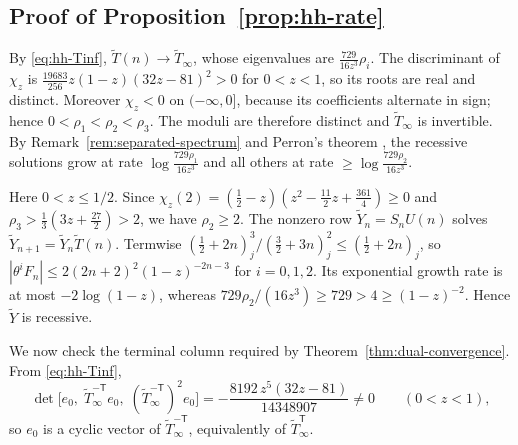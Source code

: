 \documentclass[oneside,english,11pt]{amsart}
\begin{document}
\subsection{Proof of Proposition~\ref{prop:hh-rate}}\label{app:hh-rate}
By \eqref{eq:hh-Tinf}, $\tilde T(n)\to\tilde T_\infty$, whose eigenvalues are $\frac{729}{16z^3}\rho_i$. The discriminant of
$\chi_z$ is $\frac{19683}{256}z(1-z)(32z-81)^2>0$ for $0<z<1$, so its roots are real and distinct. Moreover $\chi_z<0$ on $(-\infty,0]$,
because its coefficients alternate in sign; hence $0<\rho_1<\rho_2<\rho_3$. The moduli are therefore distinct and $\tilde T_\infty$
is invertible. By Remark~\ref{rem:separated-spectrum} and Perron's theorem \cite{elaydi2005introduction}, the recessive
solutions grow at rate $\log\frac{729\rho_1}{16z^3}$ and all others at rate $\ge\log\frac{729\rho_2}{16z^3}$.

Here $0<z\le1/2$. Since
$\chi_z(2)=(\frac12-z)(z^2-\frac{11}2z+\frac{361}4)\ge0$ and $\rho_3>\frac13(3z+\frac{27}2)>2$,
we have $\rho_2\ge2$. The nonzero row $\tilde Y_n=S_nU(n)$ solves $\tilde Y_{n+1}=\tilde Y_n\tilde T(n)$.
Termwise $(\frac12+2n)_j^3/(\frac32+3n)_j^2\le(\frac12+2n)_j$, so
$|\theta^iF_n|\le2(2n+2)^2(1-z)^{-2n-3}$ for $i=0,1,2$.
Its exponential growth rate is at most $-2\log(1-z)$, whereas
$729\rho_2/(16z^3)\ge729>4\ge(1-z)^{-2}$. Hence $\tilde Y$ is recessive.

We now check the terminal column required by Theorem~\ref{thm:dual-convergence}. From \eqref{eq:hh-Tinf},
\begin{equation}\label{eq:hh-cyclic}
 \det\bigl[e_0,\;\tilde T_\infty^{-\mathsf T}e_0,\;(\tilde T_\infty^{-\mathsf T})^2e_0\bigr]
 =-\frac{8192\,z^5(32z-81)}{14348907}\ne0\qquad(0<z<1),
\end{equation}
so $e_0$ is a cyclic vector of $\tilde T_\infty^{-\mathsf T}$, equivalently of $\tilde T_\infty^{\mathsf T}$.
\end{document}

